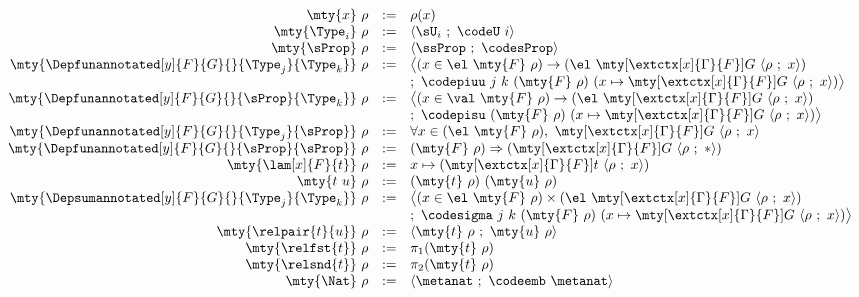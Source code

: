 \begin{figure}
  \begin{small}
\[
\begin{array}{rcl}
  \mty{x}\ \rho & := & \rho(x) \\
  \mty{\Type_i}\ \rho & := & \langle \sU_i\ ;\ \codeU\ i \rangle \\
  \mty{\sProp}\ \rho & := & \langle \ssProp\ ;\ \codesProp \rangle\\
  \mty{\Depfunannotated[y]{F}{G}{}{\Type_j}{\Type_k}}\ \rho & := & \big\langle (x \in\el\ \mty{F}\ \rho)\to (\el\ \mty[{\extctx[x]{\Gamma}{F}}]{G}\ \langle \rho\ ;\ x\rangle)\\
& & ;\ \codepiuu\ j\ k\ (\mty{F}\ \rho)\ (x \mapsto \mty[{\extctx[x]{\Gamma}{F}}]{G}\ \langle \rho\ ;\ x\rangle) \big\rangle\\
  \mty{\Depfunannotated[y]{F}{G}{}{\sProp}{\Type_k}}\ \rho & := & \big\langle (x \in\val\ \mty{F}\ \rho)\to (\el\ \mty[{\extctx[x]{\Gamma}{F}}]{G}\ \langle \rho\ ;\ x\rangle)\\
& & ;\ \codepisu\ (\mty{F}\ \rho)\ (x \mapsto \mty[{\extctx[x]{\Gamma}{F}}]{G}\ \langle \rho\ ;\ x\rangle) \big\rangle\\
  \mty{\Depfunannotated[y]{F}{G}{}{\Type_j}{\sProp}}\ \rho & := & \forall x \in (\el\ \mty{F}\ \rho),\ \mty[{\extctx[x]{\Gamma}{F}}]{G}\ \langle \rho\ ;\ x\rangle\\
  \mty{\Depfunannotated[y]{F}{G}{}{\sProp}{\sProp}}\ \rho & := & (\mty{F}\ \rho) \Rightarrow (\mty[{\extctx[x]{\Gamma}{F}}]{G}\ \langle \rho\ ;\ *\rangle)\\
  \mty{\lam[x]{F}{t}}\ \rho & := & x \mapsto (\mty[{\extctx[x]{\Gamma}{F}}]{t}\ \langle \rho\ ;\ x\rangle)\\
  \mty{t\ u}\ \rho & := & (\mty{t}\ \rho)\ (\mty{u}\ \rho)\\
  \mty{\Depsumannotated[y]{F}{G}{}{\Type_j}{\Type_k}}\ \rho & := & \big\langle (x \in\el\ \mty{F}\ \rho)\times (\el\ \mty[{\extctx[x]{\Gamma}{F}}]{G}\ \langle \rho\ ;\ x\rangle)\\
& & ;\ \codesigma\ j\ k\ (\mty{F}\ \rho)\ (x \mapsto \mty[{\extctx[x]{\Gamma}{F}}]{G}\ \langle \rho\ ;\ x\rangle) \big\rangle\\
  \mty{\relpair{t}{u}}\ \rho & := & \langle \mty{t}\ \rho\ ;\ \mty{u}\ \rho \rangle \\
  \mty{\relfst{t}}\ \rho & := & \pi_1 (\mty{t}\ \rho) \\
  \mty{\relsnd{t}}\ \rho & := & \pi_2 (\mty{t}\ \rho) \\
  \mty{\Nat}\ \rho & := & \langle \metanat\ ;\ \codeemb\ \metanat \rangle \\

\end{array}\]
\end{small}
\end{figure}
